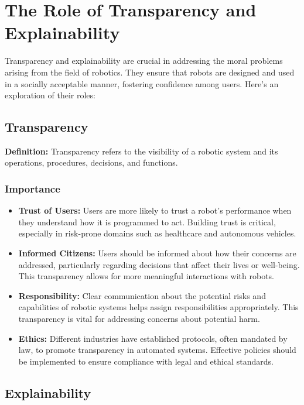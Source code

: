 \section{The Role of Transparency and Explainability}

Transparency and explainability are crucial in addressing the moral problems arising from the field of robotics. They ensure that robots are designed and used in a socially acceptable manner, fostering confidence among users. Here’s an exploration of their roles:

\subsection{Transparency}

\textbf{Definition:} Transparency refers to the visibility of a robotic system and its operations, procedures, decisions, and functions.

\subsubsection{Importance}
\begin{itemize}
    \item \textbf{Trust of Users:} Users are more likely to trust a robot's performance when they understand how it is programmed to act. Building trust is critical, especially in risk-prone domains such as healthcare and autonomous vehicles.
    
    \item \textbf{Informed Citizens:} Users should be informed about how their concerns are addressed, particularly regarding decisions that affect their lives or well-being. This transparency allows for more meaningful interactions with robots.
    
    \item \textbf{Responsibility:} Clear communication about the potential risks and capabilities of robotic systems helps assign responsibilities appropriately. This transparency is vital for addressing concerns about potential harm.
    
    \item \textbf{Ethics:} Different industries have established protocols, often mandated by law, to promote transparency in automated systems. Effective policies should be implemented to ensure compliance with legal and ethical standards.
\end{itemize}

\subsection{Explainability}

